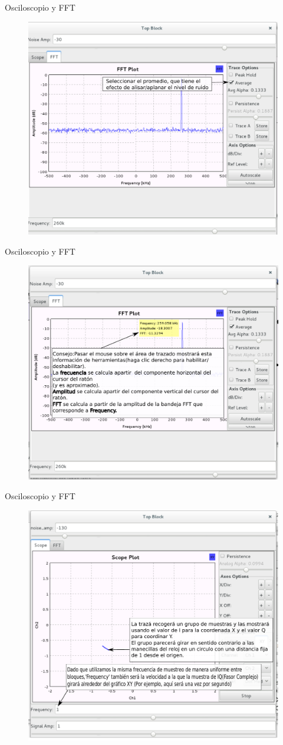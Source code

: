 \begin{frame}{Osciloscopio y FFT}
\begin{figure}[H]
\centering
\includegraphics[width=\textwidth, height=0.58\textwidth]{lab2/pdf/lab212.pdf}
\end{figure}
\end{frame}

\begin{frame}{Osciloscopio y FFT}
\begin{figure}[H]
\centering
\includegraphics[width=\textwidth, height=0.58\textwidth]{lab2/pdf/lab213.pdf}
\end{figure}
\end{frame}

\begin{frame}{Osciloscopio y FFT}
\begin{figure}[H]
\centering
\includegraphics[width=\textwidth, height=0.58\textwidth]{lab2/pdf/lab214.pdf}
\end{figure}
\end{frame}


